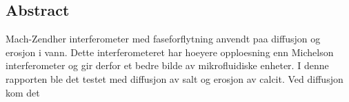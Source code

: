 \subsection {Abstract}
  Mach-Zendher interferometer med faseforflytning anvendt paa diffusjon og erosjon
  i vann. Dette interferometeret har hoeyere opploesning enn Michelson interferometer 
  og gir derfor et bedre bilde av mikrofluidiske enheter. I denne rapporten ble 
  det testet med diffusjon av salt og erosjon av calcit. Ved diffusjon kom det 

